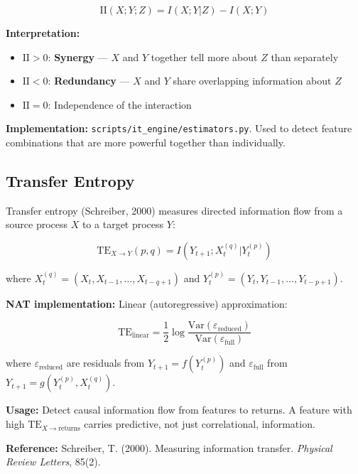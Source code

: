 \documentclass[11pt,a4paper]{article}
\begin{document}
\begin{equation}
\text{II}(X; Y; Z) = I(X; Y | Z) - I(X; Y)
\end{equation}

\textbf{Interpretation:}
\begin{itemize}
    \item $\text{II} > 0$: \textbf{Synergy} --- $X$ and $Y$ together tell more about $Z$ than separately
    \item $\text{II} < 0$: \textbf{Redundancy} --- $X$ and $Y$ share overlapping information about $Z$
    \item $\text{II} = 0$: Independence of the interaction
\end{itemize}

\textbf{Implementation:} \texttt{scripts/it\_engine/estimators.py}. Used to detect feature combinations that are more powerful together than individually.

\subsection{Transfer Entropy}

Transfer entropy (Schreiber, 2000) measures directed information flow from a source process $X$ to a target process $Y$:

\begin{equation}
\text{TE}_{X \to Y}(p, q) = I(Y_{t+1}; X_t^{(q)} | Y_t^{(p)})
\end{equation}

where $X_t^{(q)} = (X_t, X_{t-1}, \ldots, X_{t-q+1})$ and $Y_t^{(p)} = (Y_t, Y_{t-1}, \ldots, Y_{t-p+1})$.

\textbf{NAT implementation:} Linear (autoregressive) approximation:

\begin{equation}
\text{TE}_{\text{linear}} = \frac{1}{2} \log \frac{\text{Var}(\varepsilon_{\text{reduced}})}{\text{Var}(\varepsilon_{\text{full}})}
\end{equation}

where $\varepsilon_{\text{reduced}}$ are residuals from $Y_{t+1} = f(Y_t^{(p)})$ and $\varepsilon_{\text{full}}$ from $Y_{t+1} = g(Y_t^{(p)}, X_t^{(q)})$.

\textbf{Usage:} Detect causal information flow from features to returns. A feature with high $\text{TE}_{X \to \text{returns}}$ carries predictive, not just correlational, information.

\textbf{Reference:} Schreiber, T. (2000). Measuring information transfer. \textit{Physical Review Letters}, 85(2).
\end{document}
